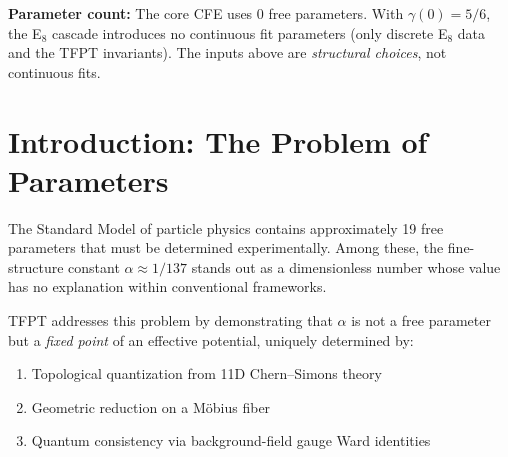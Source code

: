 \begin{tcolorbox}[colback=yellow!5, colframe=yellow!60!black, 
    title={\textbf{Assumption Ledger: Established vs.\ New}}, fonttitle=\bfseries]
\textbf{Parameter count:} The core CFE uses 0 free parameters. With $\gamma(0)=5/6$, the E$_8$ cascade 
introduces no continuous fit parameters (only discrete E$_8$ data and the TFPT invariants). 
The inputs above are \emph{structural choices}, not continuous fits.
\end{tcolorbox}

\tableofcontents
\newpage

\section{Introduction: The Problem of Parameters}

The Standard Model of particle physics contains approximately 19 free parameters 
that must be determined experimentally. Among these, the fine-structure constant 
$\alpha \approx 1/137$ stands out as a dimensionless number whose value has no 
explanation within conventional frameworks.

TFPT addresses this problem by demonstrating that $\alpha$ is not a free parameter 
but a \emph{fixed point} of an effective potential, uniquely determined by:
\begin{enumerate}[label=(\roman*)]
    \item Topological quantization from 11D Chern--Simons theory
    \item Geometric reduction on a M\"obius fiber
    \item Quantum consistency via background-field gauge Ward identities
\end{enumerate}

